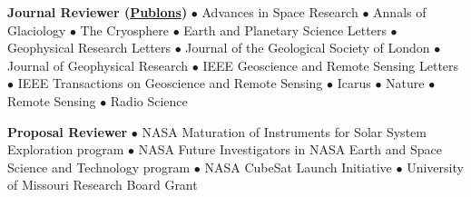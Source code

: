\noindent\textbf{Journal Reviewer (\href{https://publons.com/author/1177202/cyril-grima\#profile}{Publons})}
$\bullet$ Advances in Space Research $\bullet$ Annals of Glaciology $\bullet$ The Cryosphere $\bullet$ Earth and Planetary Science Letters $\bullet$ Geophysical Research Letters $\bullet$ Journal of the Geological Society of London $\bullet$ Journal of Geophysical Research $\bullet$ IEEE Geoscience and Remote Sensing Letters $\bullet$ IEEE Transactions on Geoscience and Remote Sensing $\bullet$ Icarus $\bullet$ Nature $\bullet$ Remote Sensing $\bullet$ Radio Science

\vspace{1em}
\noindent\textbf{Proposal Reviewer} $\bullet$
NASA Maturation of Instruments for Solar System Exploration program $\bullet$ NASA Future Investigators in NASA Earth and Space Science and Technology program $\bullet$ NASA CubeSat Launch Initiative $\bullet$ University of Missouri Research Board Grant

